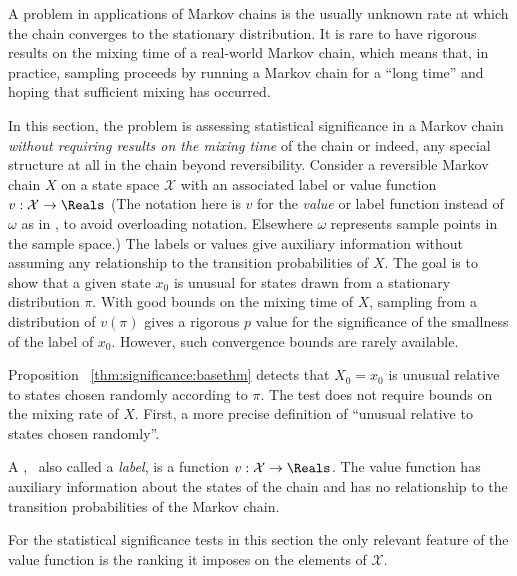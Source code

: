 \documentclass[12pt]{article}
\begin{document}
A problem in applications of Markov chains is the usually unknown rate
at which the chain converges to the stationary distribution.  It is
rare to have rigorous results on the mixing time of a real-world Markov
chain, which means that, in practice, sampling proceeds by running a
Markov chain for a ``long time'' and hoping that sufficient mixing has
occurred.

In this section, the problem is assessing statistical significance in a
Markov chain \emph{without requiring results on the mixing time} of the
chain or indeed, any special structure at all in the chain beyond
reversibility.  Consider a reversible Markov chain \( X \) on a state
space \( \mathcal{X} \) with an associated label or value function \( v
: \mathcal{X} \to \Reals \)  (The notation here is \( v \) for the
\emph{value} or label function instead of \( \omega \) as in
\cite{Chikina2860}, to avoid overloading notation.  Elsewhere \( \omega \)
represents sample points in the sample space.) The labels or values
give auxiliary information without assuming any relationship to the
transition probabilities of \( X \).  The goal is to show that a given
state \( x_0 \) is unusual for states drawn from a stationary
distribution \( \pi \).  With good bounds on the mixing time of \( X \),
sampling from a distribution of \( v(\pi) \) gives a rigorous \( p \)
value for the significance of the smallness of the label of \( x_0 \).
However, such convergence bounds are rarely available.

Proposition~%
\ref{thm:significance:basethm} detects that \( X_0 = x_0 \) is unusual
relative to states chosen randomly according to \( \pi \).  The test
does not require bounds on the mixing rate of \( X \).  First, a more
precise definition of ``unusual relative to states chosen randomly''.

\begin{definition}
    A ,~%
    also called a \emph{label}, is a function \( v :  \mathcal{X} \to
    \Reals \).  The value function has auxiliary information
    about the states of the chain and has no
    relationship to the transition probabilities of the Markov chain.
\end{definition}

\begin{remark}
    For the statistical significance tests in this section the only
    relevant feature of the value function is the ranking it imposes on
    the elements of \( \mathcal{X} \).
\end{remark}
\end{document}
